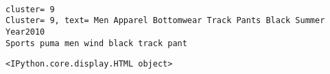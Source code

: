 \documentclass[11pt]{article}
\makeatletter
\newcommand{\boxspacing}{\kern\kvtcb@left@rule\kern\kvtcb@boxsep}
\newcommand{\prompt}[4]{
        {\ttfamily\llap{{\color{#2}[#3]:\hspace{3pt}#4}}\vspace{-\baselineskip}}
    }
\makeatother
\begin{document}
    \begin{center}
    \end{center}
    { \hspace*{\fill} \\}
    
    \begin{Verbatim}[commandchars=\\\{\}]
cluster= 9
Cluster= 9, text= Men Apparel Bottomwear Track Pants Black Summer Year2010
Sports puma men wind black track pant
    \end{Verbatim}

    
    \begin{Verbatim}[commandchars=\\\{\}]
<IPython.core.display.HTML object>
    \end{Verbatim}

    
    \begin{center}
    \end{center}
    { \hspace*{\fill} \\}
    
    \begin{center}
    \end{center}
    { \hspace*{\fill} \\}
    
    \begin{tcolorbox}[breakable, size=fbox, boxrule=1pt, pad at break*=1mm,colback=cellbackground, colframe=cellborder]
\prompt{In}{incolor}{ }{\boxspacing}
\begin{Verbatim}[commandchars=\\\{\}]

\end{Verbatim}
\end{tcolorbox}


    
    
    
\end{document}
